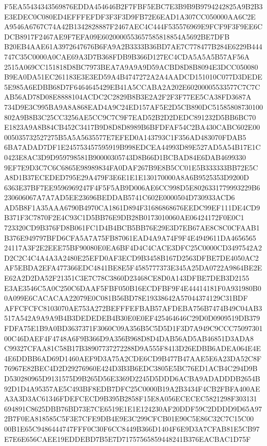 \documentclass[UTF8,fontset=fandol,zihao=-4,a4paper]{ctexart}
\begin{document}
{{F5EA55434343569876EDDA454646B2F7FBF5EBC7E3B9B9B9794242825A9B2B3E3EDEC0C080ED4EFFFEFDF3F3F3D9FB72E6EAD1A307CC050000AA6C2E
A9546A6767C74A42B1342828887F2467AEC4C444F535576969E9FCF9F3F9EE6CDCB8917F2467AE9F7EFA09E6020000553657585818854A5692BE7DFB
B20EB4AAE61A3972647676B6FA9A2B3333B36BD7AE7C778477B284E6229B444747C35C0000A0CAE69A3D7B368FDB9B366D127EC4CDA5A5A5B57AF56A
2515A069CC151818D8BC7973BEA7A9A9A9D59ACBD8D8B8094E3DCC050080B9EA0DA51EC261183E3E3ED59A4B4747272A2A4AADCD151010C077D3DEDE
5E985A6EDBB68D7F6464645429EB41A5CCABA2A202E60200005533577C7C7CAB56AD78D08E8888104ACDC2C2829B8B3E2A2F2F3F77EE5CA38FD3687A
734D9E3C995BA9A8A868EAD4A9C24ED157AF5E2D5CB890DC51585808730100802A9B8B3C25CC3256AE5CC9C7C9F7EAD52B2D2DEDC891232D5BB6BC70
E1823A9A8B84CB452C3417B9D8D8D8989B6BFDFAF54C2BA430CABC602E00005035732527275B5A5A5635577E7EFED0A143793C1F356AD483070FDAB5
6BA7ADAD7DF1E245753457595919B998EDCEA44993D89E527AD5A54B17E1C0423E8AC3D9D959798581B90000305743D8B66D1BCBAD84E6DAB4699330
9EF7E9D3C7C6C6865E98989834FA0DAF267B9E8B5CC01E5B333333BB72E5CA8D1B37ECEDED795E29A479F3E6E1E1E130170000A8A6B9525353D9200D
6363E37BF7EE9596969247F4F5F5AB9D006AE6CC998D5E8026331779993229B6230606067A7A7AD5EE23696BEDDAB5741C602E0000504D730933ACD6
AD5B8F1A35AAA6790B4970CA1861D894F31686868676EEDC99EF111DE4CD9B371F3C7870F2E4C93C1D5BB76E9DB28B0173010060AE06424172F0E0C1
723320CD9B376FD8B061FC1D4B4BCB5BB76E29E3D7EB67AE8C8C0CFAAB1B376E949797BFD6CFA5A7A75FB87061EAD4A9A74F9F4E4949611DA4656565
24117A3F2E2EEE75BF90080E0EA6BF4D4C4CACE3DFC25C0000CD3497542A2D2C2C4C4A4A3A2480E25EFD0AF3ECD9B3458B167D2563DFBE7DE4050AC2
AF5EBDA2EFA477366EDC4841BE8E5F4585777373E345A25DA0722A9864BE2EE62A2D2DA52F21351C3E7C78C3860D23468CE8D0A143DFBE7DEB3D2155
E3AE3546C5A0C250C6DAAF5FBF050B16ECDFBF9F4E44414181F0A931980B00A099E6CACACAA22079E0C081B56BD78E19338642A57044374129C31BDF
AFFCFCFC8103070AE753A272BEFFFEFBAB57AFDEBA756B7474B49C04AB3517A542A9A9A9B4B3DEDEDEB4B30E0E0EF425464646C29D0D0909519DB379
FDFA75E1B9A0BD3637371F3060C09A356B5C5D5D1F3D7A949C9CCC7509730100C46DAEF4F4748A6F9B366D9A356B968D8D4DAB56AD5AB46851D3ADA8
C99327CFAA81C58B17B38907737272288D9A555F8413D26EDBB6ADEA064E4E4E6DDBB6AD69D1460AEF9D3A75A2CDE6CD9B477B47AAE5E6A23DA52C8F
76967E82BEC4D2D29276960E424D3B3B6EDC3805E5BC76ED1ACB4C294D9BD530280965D9131575D9B265D56E3369D2245D5DDD6ACBA9ADADDDB2654B
92D1D4A95357AE5C493BF8EDB7DFC25C0000B19A2B3434F4CB2FBFA400AEA3A3D3AC61346FDEFCECD9B395B2858F15E8A056ECECEC5821298F303131
694891C8625DBB76BD73E7CE6519E1E1E124230AF20DDF59C2DDDD9D65A972B7F0EA818585C5F3E7CFE9DB4E9E3C299CFCB01E90C5E86C32C7C15C00
00B1E65C9486444747FFF0C30F6CC8449B366D1404F6E9D3A7CFAB81E5CB97E7E6E656CAEE19EDDEBD7B5E7D71757565859448241B376EACBAC1D75F
}}
\end{document}
